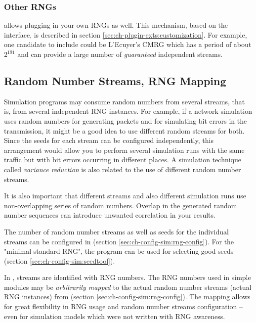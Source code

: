 \subsubsection{Other RNGs}

{\opp} allows plugging in your own RNGs as well. This mechanism,
based on the  interface, is described in section
\ref{sec:ch-plugin-exts:customization}.
For example, one candidate to include could be L'Ecuyer's CMRG \cite{LEcuyer02}
which has a period of about $2^{191}$ and can provide a large
number of \textit{guaranteed} independent streams.


\subsection{Random Number Streams, RNG Mapping}

Simulation programs may consume random numbers from several streams,
that is, from several independent RNG instances. For example, if a
network simulation uses random numbers for generating packets and
for simulating bit errors in the transmission, it might be a good
idea to use different random streams for both. Since the seeds
for each stream can be configured independently, this arrangement
would allow you to perform several simulation runs with the same traffic
but with bit errors occurring in different places.
A simulation technique called \textit{variance reduction} is
also related to the use of different random number streams.

It is also important that different streams and also different
simulation runs use non-overlapping series of random numbers.
Overlap in the generated random number sequences can introduce
unwanted correlation in your results.

The number of random number streams as well as seeds for the individual
streams can be configured in 
(section \ref{sec:ch-config-sim:rng-config}).
For the "minimal standard RNG", the  program can be
used for selecting good seeds (section \ref{sec:ch-config-sim:seedtool}).

In {\opp}, streams are identified with RNG numbers. The RNG numbers
used in simple modules may be \textit{arbitrarily mapped} to the actual
random number streams (actual RNG instances) from 
(section \ref{sec:ch-config-sim:rng-config}). The mapping allows
for great flexibility in RNG usage and random number streams
configuration -- even for simulation models which were not written
with RNG awareness.



